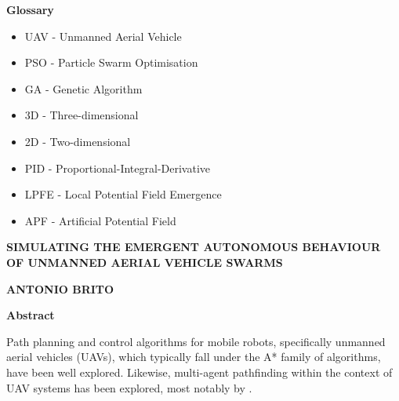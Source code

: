 \documentclass[12pt]{article}
\begin{document}
\thispagestyle{empty}
\listoffigures
\listoftables
\vspace{1cm}
\begin{adjustwidth}{-0.1cm}{0cm}
\Large{\textbf{Glossary}}
\end{adjustwidth}
\normalsize
\begin{itemize}
    \item UAV - Unmanned Aerial Vehicle
    \item PSO - Particle Swarm Optimisation
    \item GA - Genetic Algorithm
    \item 3D - Three-dimensional
    \item 2D - Two-dimensional
    \item PID - Proportional-Integral-Derivative
    \item LPFE - Local Potential Field Emergence
    \item APF - Artificial Potential Field
\end{itemize}

\newpage

\begin{center}
    \vspace{0.8cm}
    \Large
    \textbf{SIMULATING THE EMERGENT AUTONOMOUS BEHAVIOUR OF UNMANNED AERIAL VEHICLE SWARMS}

    \large
    \vspace{0.8cm}
    \textbf{ANTONIO BRITO}

    \vfill
       
    \Large
    \textbf{Abstract}
    \vspace{2cm}
\end{center}
\onehalfspacing

Path planning and control algorithms for mobile robots, specifically unmanned aerial vehicles (UAVs), which typically fall under the A* family of algorithms, have been well explored\cite{IJSAEM,Chen}. Likewise, multi-agent pathfinding within the context of UAV systems has been explored, most notably by \citet{burwell_2019}.
\end{document}
